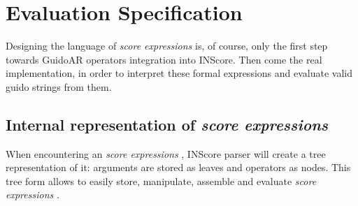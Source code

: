 \documentclass{article}
\newcommand{\sExpr}{\emph{score expressions} }
\begin{document}




\section{Evaluation Specification}
Designing the language of \sExpr is, of course, only the first step towards GuidoAR operators integration into INScore. Then come the real implementation, in order to interpret these formal expressions and evaluate valid guido strings from them.


\subsection{Internal representation of \sExpr}

When encountering an \sExpr, INScore parser will create a tree representation of it: arguments are stored as leaves and operators as nodes. This tree form allows to easily  store, manipulate, assemble and evaluate \sExpr.
\end{document}
